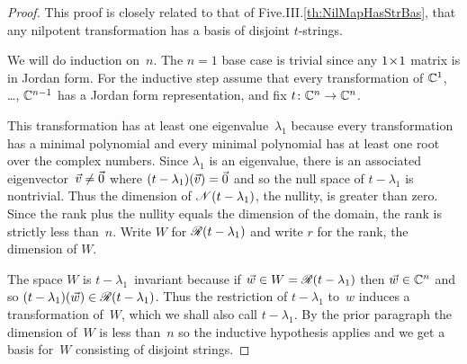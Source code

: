 \begin{proof}
This proof is closely related to that of
Five.III.\ref{th:NilMapHasStrBas}, that any nilpotent transformation
has a basis of disjoint $t$-strings.

We will do induction on~$n$.
The $n=1$ base case is trivial since any $1 \! \times \! 1$ matrix is in Jordan form.
For the inductive step assume that 
every transformation of $\mathbb{C}^1$, \ldots, $\mathbb{C}^{n-1}$ has a Jordan form
representation,
and fix $\mbox{$t\colon \mathbb{C}^n\to \mathbb{C}^n$}$.

This transformation has at least one eigenvalue~$\lambda_1$ because
every transformation has a minimal polynomial and every minimal polynomial
has at least one root over the complex numbers.
Since $\lambda_1$ is an eigenvalue, there is an associated 
eigenvector~$\vec{v}\neq\vec{0}$ where $(t-\lambda_1)(\vec{v})=\vec{0}$
and so the null space of $t-\lambda_1$ is nontrivial.
Thus the dimension of $\mathscr{N}(t-\lambda_1)$, the nullity,
is greater than zero.
Since the rank plus the nullity equals the dimension of the domain,
the rank
is strictly less than~$n$.
Write $W$ for $\mathscr{R}(t-\lambda_1)$ and write
$r$ for the rank, the dimension of $W$.

The space $W$ is $t-\lambda_1$~invariant because if 
$\vec{w}\in W=\mathscr{R}(t-\lambda_1)$ then $\vec{w}\in\mathbb{C}^n$ and so
$(t-\lambda_1)(\vec{w})\in\mathscr{R}(t-\lambda_1)$.
Thus the restriction of $t-\lambda_1$ to~$w$ induces a transformation of~$W$, 
which we shall also call $t-\lambda_1$.
By the prior paragraph the dimension of~$W$ is less than~$n$ 
so the inductive hypothesis applies and
we get a basis for~$W$ consisting of disjoint strings.


\end{proof}
